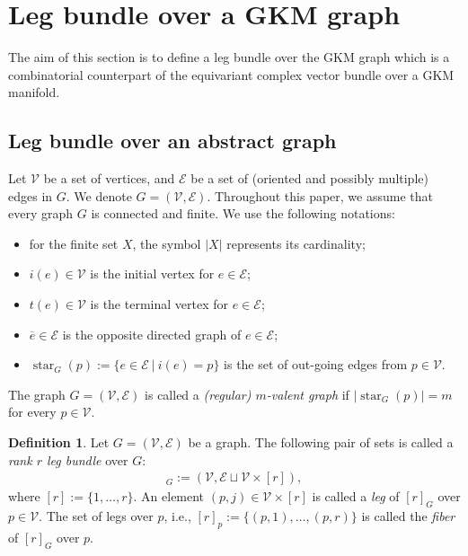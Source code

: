 \documentclass[12pt]{amsart}
\theoremstyle{definition}
\newtheorem{definition}[theorem]{Definition}
\theoremstyle{remark}
\numberwithin{equation}{section}
\DeclareMathOperator{\str}{star}
\begin{document}
\section{Leg bundle over a GKM graph}
\label{sect:2}

The aim of this section is to define a leg bundle over the GKM graph which is a combinatorial counterpart of the equivariant complex vector bundle over a GKM manifold.

\subsection{Leg bundle over an abstract graph}
\label{sect:2.1}

Let $\mathcal{V}$ be a set of vertices, and $\mathcal{E}$ be a set of (oriented and possibly multiple) edges in $G$.
We denote $G=(\mathcal{V},\mathcal{E})$.
Throughout this paper, we assume that every graph $G$ is connected and finite.
We use the following notations:
\begin{itemize}
\item for the finite set $X$, the symbol $|X|$ represents its cardinality;
\item $i(e)\in \mathcal{V}$ is the initial vertex for $e\in \mathcal{E}$;
\item $t(e)\in \mathcal{V}$ is the terminal vertex for $e\in \mathcal{E}$;
\item $\overline{e}\in \mathcal{E}$ is the opposite directed graph of $e\in \mathcal{E}$;
\item $\str_{G}(p):=\{e\in \mathcal{E}\ |\ i(e)=p\}$ is the set of out-going edges from $p\in \mathcal{V}$.
\end{itemize}
The graph $G=(\mathcal{V},\mathcal{E})$ is called a {\it (regular) $m$-valent graph} if $|\str_{G}(p)|=m$ for every $p\in \mathcal{V}$.

\begin{definition}
Let $G=(\mathcal{V},\mathcal{E})$ be a graph.
The following pair of sets is called a {\it rank $r$ leg bundle} over $G$:
\begin{align*}
[r]_{G}:=
(\mathcal{V}, \mathcal{E}\sqcup \mathcal{V}\times [r]),
\end{align*}
where $[r]:=\{1,\ldots,r\}$.
An element $(p,j)\in \mathcal{V}\times [r]$ is called a {\it leg} of $[r]_{G}$ over $p\in \mathcal{V}$.
The set of legs over $p$, i.e., $[r]_{p}:=\{(p,1),\ldots , (p,r)\}$ is called the {\it fiber} of $[r]_{G}$ over $p$.
\end{definition}
\end{document}
